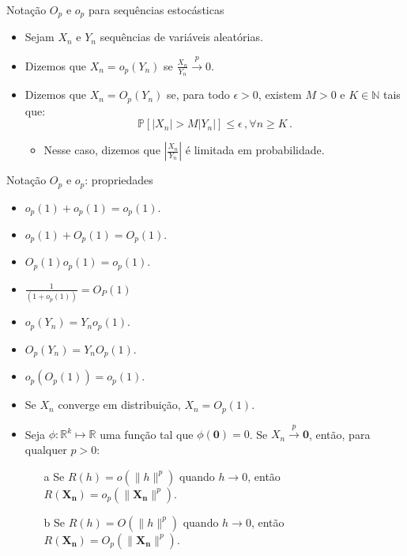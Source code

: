 \documentclass[11pt]{beamer}
\begin{document}
		\begin{frame}{Notação $O_p$ e $o_p$ para sequências estocásticas}
		\begin{itemize}
			\item Sejam $X_n$ e $Y_n$ sequências de {\color{red}variáveis aleatórias}. 
			\item Dizemos que $X_n = o_p(Y_n)$ se $\frac{X_n}{Y_n} \overset{p}{\to} 0$.
			\item Dizemos que $X_n = O_p(Y_n)$ se, para todo $\epsilon > 0$, existem $M > 0$ e $K \in \mathbb{N}$ tais que:
			$$\mathbb{P}[|X_n|> M |Y_n|] \leq \epsilon\, , \forall n \geq K\, .$$
			\begin{itemize}
				\item Nesse caso, dizemos que $\left|\frac{X_n}{Y_n}\right|$ é {\color{magenta}limitada  em probabilidade}.
			\end{itemize}			
				\end{itemize}
	\end{frame}
	\begin{frame}{Notação $O_p$ e $o_p$: propriedades}
		\begin{lemma}
		\begin{itemize}
			\item $o_p(1) + o_p(1) = o_p(1)$.
			\item $o_p(1) + O_p(1) = O_p(1)$.
			\item $O_p(1) o_p(1) = o_p(1)$.
			\item $\frac{1}{(1+o_p(1))} = O_P(1)$
			\item $o_p(Y_n) = Y_n o_p(1)$. 
			\item $O_p(Y_n) = Y_n O_p(1)$. 
			\item $o_p(O_p(1)) = o_p(1)$.
			\item Se $X_n$ converge em distribuição, $X_n = O_p(1)$.
			\item Seja $\phi: \mathbb{R}^k \mapsto \mathbb{R}$ uma função tal que $\phi(\boldsymbol{0}) = 0$. Se $X_n \overset{p}{\to} \boldsymbol{0}$, então, para qualquer $p > 0$:
			\begin{enumerate}
				\item[a] Se $R(h) = o(\lVert h \rVert^p)$ quando $h \to 0$, então $R(\boldsymbol{X_n}) = o_p(\lVert \boldsymbol{X_n} \rVert^p)$.
				\item[b] Se $R(h) = O(\lVert h \rVert^p)$ quando $h \to 0$, então $R(\boldsymbol{X_n}) = O_p(\lVert \boldsymbol{X_n} \rVert^p)$.
			\end{enumerate}
		\end{itemize}
	\end{lemma}
	\end{frame}
	
\end{document}
